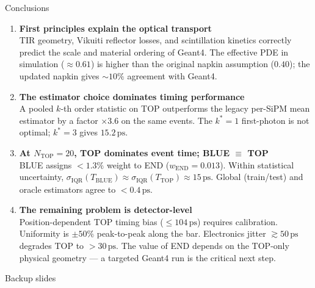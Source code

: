 \documentclass[aspectratio=169,9pt]{beamer}
\newcommand{\sigIQR}{\sigma_{\mathrm{IQR}}}
\newcommand{\NTOP}{N_{\mathrm{TOP}}}
\newcommand{\Tblue}{T_{\mathrm{BLUE}}}
\newcommand{\TTOP}{T_{\mathrm{TOP}}}
\newcommand{\wend}{w_{\mathrm{END}}}
\newcommand{\sTOP}{\sigIQR(\TTOP)}
\newcommand{\sBLUE}{\sigIQR(\Tblue)}
\newcommand{\ps}{\ensuremath{\,\mathrm{ps}}}
\begin{document}
\begin{frame}{Conclusions}
\begin{enumerate}
  \setlength\itemsep{6pt}

  \item \textbf{First principles explain the optical transport}\\
    TIR geometry, Vikuiti reflector losses, and scintillation kinetics
    correctly predict the scale and material ordering of Geant4.
    The effective PDE in simulation ($\approx0.61$) is higher than the
    original napkin assumption ($0.40$); the updated napkin gives
    $\sim\!10\%$ agreement with Geant4.

  \item \textbf{The estimator choice dominates timing performance}\\
    A pooled $k$-th order statistic on TOP outperforms the legacy
    per-SiPM mean estimator by a factor $\times 3.6$ on the same events.
    The $k^*=1$ first-photon is not optimal; $k^*=3$ gives $15.2\ps$.

  \item \textbf{At $\NTOP=20$, TOP dominates event time; BLUE $\equiv$ TOP}\\
    BLUE assigns $<1.3\%$ weight to END ($\wend=0.013$). Within
    statistical uncertainty, $\sBLUE \approx \sTOP \approx 15\ps$.
    Global (train/test) and oracle estimators agree to $<0.4\ps$.

  \item \textbf{The remaining problem is detector-level}\\
    Position-dependent TOP timing bias ($\leq104\ps$) requires calibration.
    Uniformity is $\pm50\%$ peak-to-peak along the bar.
    Electronics jitter $\gtrsim 50\ps$ degrades TOP to $>30\ps$.
    The value of END depends on the TOP-only physical geometry —
    a targeted Geant4 run is the critical next step.
\end{enumerate}
\end{frame}

\appendix

\begin{frame}
\begin{center}
  \large Backup slides
\end{center}
\end{frame}
\end{document}
